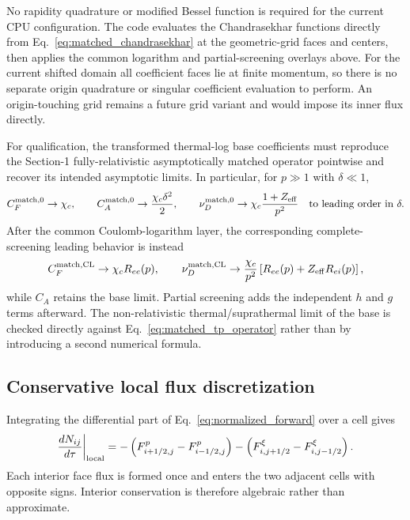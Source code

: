 \documentclass[11pt]{article}
\begin{document}
No rapidity quadrature or modified Bessel function is required for the current CPU
configuration.  The code evaluates the Chandrasekhar functions directly from
Eq.~\eqref{eq:matched_chandrasekhar} at the geometric-grid faces and centers, then
applies the common logarithm and partial-screening overlays above.
For the current shifted domain all coefficient faces lie at finite momentum, so there is
no separate origin quadrature or singular coefficient evaluation to perform.  An
origin-touching grid remains a future grid variant and would impose its inner flux
directly.

For qualification, the transformed thermal-log base coefficients must reproduce the
Section-1 fully-relativistic asymptotically matched operator pointwise and recover its
intended asymptotic limits.  In particular, for $p\gg1$ with $\delta\ll1$,
\begin{equation}
 C_F^{\rm match,0}\rightarrow\chi_c,\qquad
 C_A^{\rm match,0}\rightarrow\frac{\chi_c\delta^2}{2},\qquad
 \nu_D^{\rm match,0}\rightarrow
 \chi_c\frac{1+Z_{\rm eff}}{p^2}
 \quad\text{to leading order in }\delta.
 \label{eq:matched_relativistic_limits}
\end{equation}
After the common Coulomb-logarithm layer, the corresponding complete-screening leading
behavior is instead
\begin{equation}
 C_F^{\rm match,CL}\rightarrow\chi_c R_{ee}(p),\qquad
 \nu_D^{\rm match,CL}\rightarrow
 \frac{\chi_c}{p^2}\left[R_{ee}(p)+Z_{\rm eff}R_{ei}(p)\right],
 \label{eq:matched_relativistic_limits_logs}
\end{equation}
while $C_A$ retains the base limit.  Partial screening adds the independent $h$ and $g$
terms afterward.  The non-relativistic thermal/suprathermal limit of the base is checked
directly against Eq.~\eqref{eq:matched_tp_operator} rather than by introducing a second
numerical formula.

\subsection{Conservative local flux discretization}

Integrating the differential part of Eq.~\eqref{eq:normalized_forward} over a cell gives
\begin{equation}
 \frac{dN_{ij}}{d\tau}\bigg|_{\rm local}
 =-\left(F^p_{i+1/2,j}-F^p_{i-1/2,j}\right)
  -\left(F^\xi_{i,j+1/2}-F^\xi_{i,j-1/2}\right).
 \label{eq:fv_balance}
\end{equation}
Each interior face flux is formed once and enters the two adjacent cells with opposite
signs.  Interior conservation is therefore algebraic rather than approximate.
\end{document}

